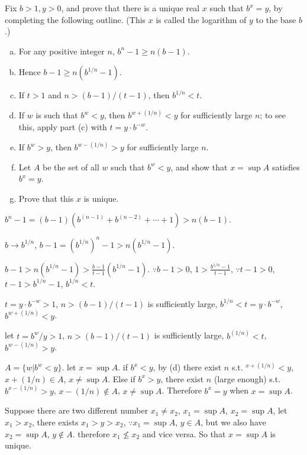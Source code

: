 
\begin{myexercise}
    \label{ex:1.7}
    Fix $b>1, y>0$, and prove that there is a unique real $x$ such that $b^x =y$, by
    completing the following outline. (This $x$ is called the logarithm of $y$ to the base $b$.)
    \begin{enumerate}[(a)]
        \item For any positive integer $n$, $b^n - 1 \geq n(b- 1)$.
        \item Hence $b- 1 \geq n(b^{1/n}-1)$.
        \item If $t>1$ and $n> (b-1)/(t-1)$, then $b^{1/n} < t$.
        \item If $w$ is such that $b^w < y$, then $b^{w+(1/n)} < y$ for sufficiently large $n$; to see this, apply part (c) with $t =y \cdot b^{-w}$.
        \item If $b^w > y$, then $b^{w-(1/n)} > y$ for sufficiently large $n$.
        \item Let $A$ be the set of all $w$ such that $b^w < y$, and show that $x = \sup A$ satisfies $b^x =y$.
        \item Prove that this $x$ is unique.
    \end{enumerate}
\end{myexercise}

\mySolve

\begin{asparaenum}[(a)]
        \item $b^n - 1 = (b-1)(b^{(n-1)} + b^{(n-2)} + \cdots + 1) > n(b-1)$.
        \item $b \rightarrow b^{1/n}$, $b - 1 = \left( b^{1/n} \right)^n -1 > n\left( b^{1/n}-1 \right)$.
        \item $b-1 > n(b^{1/n}-1) > \frac{b-1}{t-1}(b^{1/n}-1)$. $\because b-1 > 0$, $1 > \frac{b^{1/n}-1}{t-1}$, $\because t-1 >0$, $t-1 > b^{1/n}-1$, $b^{1/n} < t$.
        \item $t = y \cdot b^{-w} > 1$, $n > (b-1)/(t-1)$ is sufficiently large, $b^{1/n} < t = y \cdot b^{-w} $, $b^{w+(1/n)}<y$.
        \item let $t = b^{w}/y > 1$, $n > (b-1)/(t-1)$ is sufficiently large, $b^{(1/n)} < t$, $b^{w-(1/n)}>y$.
        \item $A = \{w|b^w<y\}$. let $x = \sup A$. if $b^x<y$, by (d) there exist $n$ s.t. $^{x+(1/n)}<y$, $x+(1/n) \in A$, $x \neq \sup A$. Else if $b^x>y$, there exist $n$ (large enough) s.t. $b^{x-(1/n)}>y$, $x-(1/n) \notin A$, $x \neq \sup A$. Therefore $b^x = y$ when $x = \sup A$.
        \item Suppose there are two different number $x_1 \neq x_2$, $x_1 = \sup A$, $x_2 = \sup A$, let $x_1 > x_2$, there exists $x_1 > y >x_2$, $\because x_1 = \sup A$, $y \in A$, but we also have $x_2 = \sup A$, $y \not\in A$. therefore $x_1 \nleq x_2$ and vice versa. So that $x = \sup A$ is unique.
    \end{asparaenum}



